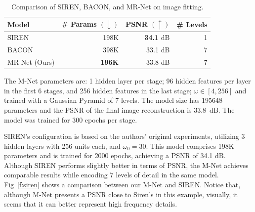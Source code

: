 \begin{table}[!h]
\centering
\small
\begin{tabular}{|l|r|r|r|}
\hline
Model & \# Params $(\downarrow)$ & PSNR $(\uparrow)$ & \# Levels \\
\hline
SIREN~\cite{sitzmann2019siren} & 198K & {\bf 34.1} dB & 1  \\
BACON~\cite{bacon2021} & 398K & 33.1 dB & 7 \\
MR-Net (Ours) & {\bf 196K} & 33.8 dB & 7  \\
\hline
\end{tabular}
\caption{Comparison of SIREN, BACON, and MR-Net on image fitting.}
\label{t:comp}
\end{table}

The M-Net parameters are: 1 hidden layer per stage; 96 hidden features per layer in the first 6 stages, and 256 hidden features in the last stage; $\omega \in [4, 256]$ and trained with a Gaussian Pyramid of 7 levels. The model size has 195648 parameters and the PSNR of the final image reconstruction is 33.8~dB. The model was trained for 300 epochs per stage.

SIREN’s configuration is based on the authors' original experiments, utilizing 3 hidden layers with 256 units each, and $\omega_0 = 30$. This model comprises 198K parameters and is trained for 2000 epochs, achieving a PSNR of 34.1 dB. Although SIREN performs slightly better in terms of PSNR, the M-Net achieves comparable results while encoding 7 levels of detail in the same model. Fig~\ref{f:siren} shows a comparison between our M-Net and SIREN. Notice that, although M-Net presents a PSNR close to Siren's in this example, visually, it seems that it can better represent high frequency details.

